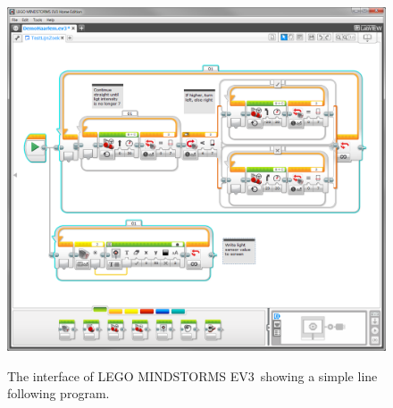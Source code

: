 \documentclass{sig-alternate}
\newcommand{\todo}[1]{\textbf{TODO: #1}}
\newcommand{\ms}{LEGO MINDSTORMS EV3}
\begin{document}
\begin{figure} [ht]
\caption{The interface of \ms~showing a simple line following program.}
\centering
\includegraphics[width=\columnwidth]{img/ms}
\label{fig:ms}
\end{figure}




\end{document}
